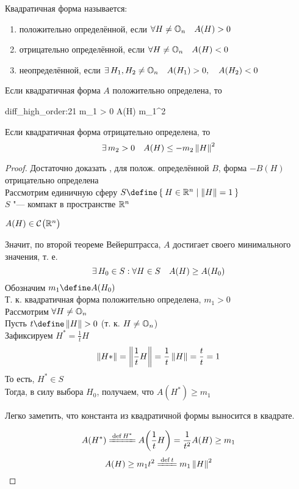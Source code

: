 \begin{remind}
	Квадратичная форма называется:
	\begin{enumerate}
		\item положительно определённой, если $ \forall H \ne \mathbb{O}_{n} \quad A(H) > 0 $
		\item отрицательно определённой, если $ \forall H \ne \mathbb{O}_{n} \quad A(H) < 0 $
		\item неопределённой, если $ \exists\, H_1, H_2 \ne \mathbb{O}_{n} \quad A(H_1) > 0, \quad A(H_2) < 0 $
	\end{enumerate}
\end{remind}

\begin{theorem}
	Если квадратичная форма $ A $ положительно определена, то
	\begin{equ}{diff_high_order:21}
		\exist m_1 > 0 \quad A(H) \ge m_1^2
	\end{equ}
	Если квадратичная форма отрицательно определена, то
	$$ \exists\, m_2 > 0 \quad A(H) \le -m_2\left\|{H}\right\|^2 $$
\end{theorem}

\begin{proof}
	Достаточно доказать , \as для полож. определённой $ B $, форма $ -B(H) $ отрицательно определена \\
	Рассмотрим единичную сферу $ S \define \set{H \in \R^n | \norm{H} = 1} $ \\
	$ S $ "--- компакт в пространстве $ \mathbb{R}^n $
	\begin{intuition}
		$ A(H) \in \mathcal{C}^{} \big( {\mathbb{R}^n} \big)  $
	\end{intuition}
	Значит, по второй теореме Вейерштрасса, $ A $ достигает своего минимального значения, т. е.
	$$ \exists\, H_0 \in S : \forall H \in S \quad A(H) \ge A(H_0) $$
	Обозначим $ m_1 \define A(H_0) $ \\
	Т. к. квадратичная форма положительно определена, $ m_1 > 0 $ \\
	Рассмотрим $ \forall H \ne \mathbb{O}_{n} $ \\
	Пусть $ t \define \norm{H} > 0 $ (т. к. $ H \ne \mathbb{O}_{n} $) \\
	Зафиксируем $ H^* = \frac1t H $
	$$ \left\|{H*}\right\| = \left\|{\frac1tH}\right\| = \frac1t\left\|{H}\right\| = \frac{t}t = 1 $$
	То есть, $ H^* \in S $ \\
	Тогда, в силу выбора $ H_0 $, получаем, что $ A(H^*) \ge m_1 $
	\begin{remark}
		Легко заметить, что константа из квадратичной формы выносится в квадрате.
	\end{remark}
	$$ A(H^*) \bdefeq{H^*} A \bigg( \frac1tH \bigg) = \frac1{t^2}A(H) \ge m_1 $$
	$$ A(H) \ge m_1t^2 \bdefeq{t} m_1 \norm{H}^2 $$
\end{proof}

